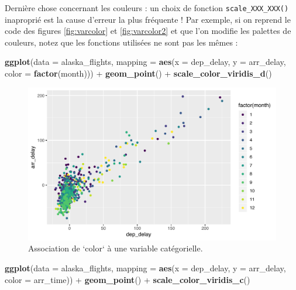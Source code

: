 \documentclass[a4paperpaper,]{article}
\newenvironment{Shaded}{\begin{snugshade}}{\end{snugshade}}
\newcommand{\DataTypeTok}[1]{\textcolor[rgb]{0.00,0.34,0.68}{#1}}
\newcommand{\KeywordTok}[1]{\textcolor[rgb]{0.12,0.11,0.11}{\textbf{#1}}}
\newcommand{\NormalTok}[1]{\textcolor[rgb]{0.12,0.11,0.11}{#1}}
\newcommand{\OperatorTok}[1]{\textcolor[rgb]{0.12,0.11,0.11}{#1}}
\newcommand{\StringTok}[1]{\textcolor[rgb]{0.75,0.01,0.01}{#1}}
\begin{document}
Dernière chose concernant les couleurs : un choix de fonction \texttt{scale\_XXX\_XXX()} inaproprié est la cause d'erreur la plus fréquente ! Par exemple, si on reprend le code des figures \ref{fig:varcolor} et \ref{fig:varcolor2} et que l'on modifie les palettes de couleurs, notez que les fonctions utilisées ne sont pas les mêmes :

\begin{Shaded}
\begin{Highlighting}[]
\KeywordTok{ggplot}\NormalTok{(}\DataTypeTok{data =}\NormalTok{ alaska_flights, }\DataTypeTok{mapping =} \KeywordTok{aes}\NormalTok{(}\DataTypeTok{x =}\NormalTok{ dep_delay, }\DataTypeTok{y =}\NormalTok{ arr_delay, }
                                            \DataTypeTok{color =} \KeywordTok{factor}\NormalTok{(month))) }\OperatorTok{+}
\StringTok{  }\KeywordTok{geom_point}\NormalTok{() }\OperatorTok{+}
\StringTok{  }\KeywordTok{scale_color_viridis_d}\NormalTok{()}
\end{Highlighting}
\end{Shaded}

\begin{figure}[htpb]

{\centering \includegraphics[width=0.9\linewidth]{figure/varcolorviridis-1} 

}

\caption{Association de `color` à une variable catégorielle.}\label{fig:varcolorviridis}
\end{figure}

\begin{Shaded}
\begin{Highlighting}[]
\KeywordTok{ggplot}\NormalTok{(}\DataTypeTok{data =}\NormalTok{ alaska_flights, }\DataTypeTok{mapping =} \KeywordTok{aes}\NormalTok{(}\DataTypeTok{x =}\NormalTok{ dep_delay, }\DataTypeTok{y =}\NormalTok{ arr_delay, }
                                            \DataTypeTok{color =}\NormalTok{ arr_time)) }\OperatorTok{+}
\StringTok{  }\KeywordTok{geom_point}\NormalTok{() }\OperatorTok{+}
\StringTok{  }\KeywordTok{scale_color_viridis_c}\NormalTok{()}
\end{Highlighting}
\end{Shaded}
\end{document}
